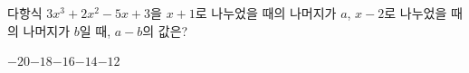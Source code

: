 다항식 $3x^3+2x^2-5x+3$을 $x+1$로 나누었을 때의 나머지가 $a$, $x-2$로 나누었을 때의 나머지가 $b$일 때, $a-b$의 값은?
\begin{choices32}{$-20$}{$-18$}{$-16$}{$-14$}{$-12$}\end{choices32}
